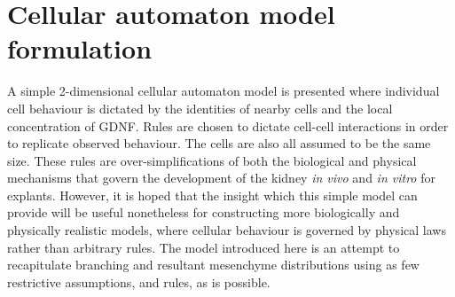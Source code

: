 \documentclass[pdftex,10pt,a4paper,twocolumn]{article}
\begin{document}
\section{Cellular automaton model formulation}\label{sec:cellularaut}
A simple 2-dimensional cellular automaton model is presented where individual cell behaviour is dictated by the identities of nearby cells and the local concentration of GDNF. Rules are chosen to dictate cell-cell interactions in order to replicate observed behaviour. The cells are also all assumed to be the same size. These rules are over-simplifications of both the biological and physical mechanisms that govern the development of the kidney \textit{in vivo} and \textit{in vitro} for explants. However, it is hoped that the insight which this simple model can provide will be useful nonetheless for constructing more biologically and physically realistic models, where cellular behaviour is governed by physical laws rather than arbitrary rules. The model introduced here is an attempt to recapitulate branching and resultant mesenchyme distributions using as few restrictive assumptions, and rules, as is possible.
\end{document}
